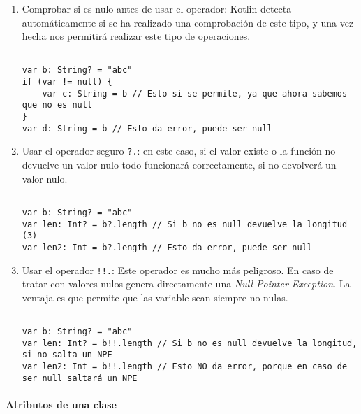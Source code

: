 \begin{enumerate}
	\item Comprobar si es nulo antes de usar el operador: Kotlin detecta automáticamente si se ha realizado una comprobación de este tipo, y una vez hecha nos permitirá realizar este tipo de operaciones.
	
\begin{verbatim}

var b: String? = "abc"
if (var != null) {
	var c: String = b // Esto si se permite, ya que ahora sabemos que no es null
}
var d: String = b // Esto da error, puede ser null

\end{verbatim}

	\item Usar el operador seguro \texttt{?.}: en este caso, si el valor existe o la función no devuelve un valor nulo todo funcionará correctamente, si no devolverá un valor nulo.
	
\begin{verbatim}

var b: String? = "abc"
var len: Int? = b?.length // Si b no es null devuelve la longitud (3)
var len2: Int = b?.length // Esto da error, puede ser null

\end{verbatim}

	\item Usar el operador \texttt{!!.}: Este operador es mucho más peligroso. En caso de tratar con valores nulos genera directamente una \textit{Null Pointer Exception}. La ventaja es que permite que las variable sean siempre no nulas.
	
\begin{verbatim}

var b: String? = "abc"
var len: Int? = b!!.length // Si b no es null devuelve la longitud, si no salta un NPE
var len2: Int = b!!.length // Esto NO da error, porque en caso de ser null saltará un NPE

\end{verbatim}

\end{enumerate}

\paragraph{Atributos de una clase}

